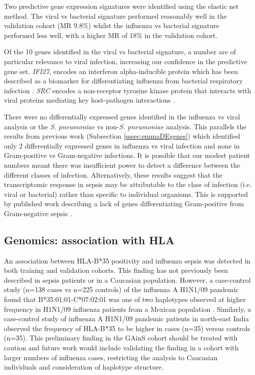 Two predictive gene expression signatures were identified using the elastic net method. The viral vs bacterial signature performed reasonably well in the validation cohort (MR 9.8\%) whilst the influenza vs bacterial signature performed less well, with a higher MR of 18\% in the validation cohort. 

Of the 10 genes identified in the viral vs bacterial signature, a number are of particular relevance to viral infection, increasing our confidence in the predictive gene set. \textit{IFI27}, encodes an interferon alpha-inducible protein which has been described as a biomarker for differentiating influenza from bacterial respiratory infection \parencite{Tang2017}. \textit{SRC} encodes a non-receptor tyrosine kinase protein that interacts with viral proteins mediating key host-pathogen interactions \parencite{Pagano2013}.

There were no differentially expressed genes identified in the influenza vs viral analysis or the \textit{S. pneumoniae} vs non-\textit{S. pneumoniae} analysis. This parallels the results from previous work (Subsection \ref{sssec:emmaDEgenes}) which identified only 2 differentially expressed genes in influenza vs viral infection and none in Gram-positive vs Gram-negative infections. It is possible that our modest patient numbers meant there was insufficient power to detect a difference between the different classes of infection. Alternatively, these results suggest that the transcriptomic response in sepsis may be attributable to the class of infection (i.e. viral or bacterial) rather than specific to individual organisms. This is supported by published work describing a lack of genes differentiating Gram-positive from Gram-negative sepsis \parencite{Tang2008}. 

\subsection{Genomics: association with HLA}
An association between HLA-B*35 positivity and influenza sepsis was detected in both training and validation cohorts. This finding has not previously been described in sepsis patients or in a Caucasian population. However, a case-control study (n=138 cases vs n=225 controls) of the influenza A H1N1/09 pandemic found that B*35:01:01-C*07:02:01 was one of two haplotypes observed at higher frequency in H1N1/09 influenza patients from a Mexican population \parencite{Falfan-Valencia2018}. Similarly, a case-control study of influenza A H1N1/09 pandemic patients in north-east India observed the frequency of HLA-B*35 to be higher in cases (n=35) versus controls (n=35). This preliminary finding in the GAinS cohort should be treated with caution and future work would include validating the finding in a cohort with larger numbers of influenza cases, restricting the analysis to Caucasian individuals and consideration of haplotype structure.

